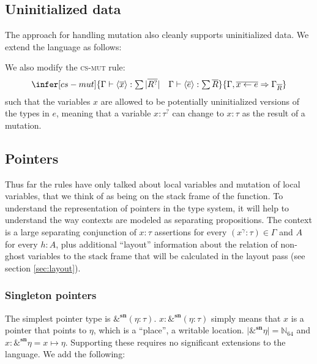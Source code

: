 \documentclass[acmsmall,nonacm]{acmart}
\newcommand*{\N}{\mathbb{N}}
\newcommand{\core}[1]{{\mid}#1{\mid}}
\newcommand{\proves}{\vdash}
\newcommand{\constep}{\Rightarrow}
\begin{document}
\subsection{Uninitialized data}

The approach for handling mutation also cleanly supports uninitialized data. We extend the language as follows:

We also modify the \textsc{cs-mut} rule:
$$\infer[cs-mut]
    {\Gamma \proves \langle \overline{x}\rangle:\textstyle\sum\core{\overline{R^?}}\quad
      \Gamma \proves \langle \overline{e}\rangle:\textstyle\sum\overline{R}}
    {\Gamma,\overline{x\gets e} \constep\Gamma_{\overline{R}}}$$
such that the variables $x$ are allowed to be potentially uninitialized versions of the types in $e$, meaning that a variable $x:\tau^?$ can change to $x:\tau$ as the result of a mutation.

\subsection{Pointers}\label{sec:pointers}

Thus far the rules have only talked about local variables and mutation of local variables, that we think of as being on the stack frame of the function. To understand the representation of pointers in the type system, it will help to understand the way contexts are modeled as separating propositions. The context is a large separating conjunction of $\boxed{x:\tau}$ assertions for every $(x^\gamma:\tau)\in\Gamma$ and $A$ for every $h:A$, plus additional ``layout'' information about the relation of non-ghost variables to the stack frame that will be calculated in the layout pass (see section \ref{sec:layout}).

\subsubsection{Singleton pointers}

The simplest pointer type is $\&^\mathbf{sn}(\eta:\tau)$. $x:\&^\mathbf{sn}(\eta:\tau)$ simply means that $x$ is a pointer that points to $\eta$, which is a ``place'', a writable location. $\core{\&^\mathbf{sn}\eta}=\N_{64}$ and $\boxed{x:\&^\mathbf{sn}\eta}=x\mapsto \eta$. Supporting these requires no significant extensions to the language. We add the following:
\end{document}
